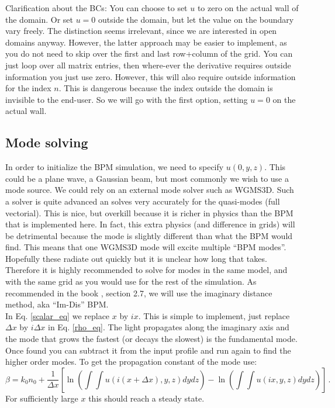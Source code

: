 \documentclass[]{article}
\begin{document}
	
	Clarification about the BCs: You can choose to set $u$ to zero on the actual wall of the domain. Or set $u=0$ outside the domain, but let the value on the boundary vary freely. The distinction seems irrelevant, since we are interested in open domains anyway. However, the latter approach may be easier to implement, as you do not need to skip over the first and last row+column of the grid. You can just loop over all matrix entries, then where-ever the derivative requires outside information you just use zero. However, this will also require outside information for the index $n$. This is dangerous because the index outside the domain is invisible to the end-user. So we will go with the first option, setting $u=0$ on the actual wall.
	
	\subsection{Mode solving}
	In order to initialize the BPM simulation, we need to specify $u(0,y,z)$. This could be a plane wave, a Gaussian beam, but most commonly we wish to use a mode source. We could rely on an external mode solver such as WGMS3D. Such a solver is quite advanced an solves very accurately for the quasi-modes (full vectorial). This is nice, but overkill because it is richer in physics than the BPM that is implemented here. In fact, this extra physics (and difference in grids) will be detrimental because the mode is slightly different than what the BPM would find. This means that one WGMS3D mode will excite multiple ``BPM modes''. Hopefully these radiate out quickly but it is unclear how long that takes. Therefore it is highly recommended to solve for modes in the same model, and with the same grid as you would use for the rest of the simulation. As recommended in the book \cite{Lifante_2015}, section 2.7, we will use the imaginary distance method, aka ``Im-Dis'' BPM.\\
	
	In Eq. \eqref{scalar_eq} we replace $x$ by $ix$. This is simple to implement, just replace $\Delta x$ by $i \Delta x$ in Eq. \eqref{rho_eq}. The light propagates along the imaginary axis and the mode that grows the fastest (or decays the slowest) is the fundamental mode. Once found you can subtract it from the input profile and run again to find the higher order modes. To get the propagation constant of the mode use:
	\begin{equation}
		\beta = k_0 n_0 + \frac{1}{\Delta x}\left[\ln\left( \int \int u(i(x+\Delta x),y,z)  dy dz \right) -\ln\left( \int \int u(ix,y,z)  dy dz \right)  \right] \, .
	\end{equation}
	For sufficiently large $x$ this should reach a steady state.
	
\end{document}
